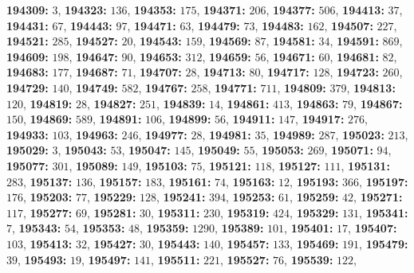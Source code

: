 \textsf{\bfseries 194309:} $3$, \textsf{\bfseries 194323:} $136$, \textsf{\bfseries 194353:} $175$, \textsf{\bfseries 194371:} $206$, \textsf{\bfseries 194377:} $506$, \textsf{\bfseries 194413:} $37$, \textsf{\bfseries 194431:} $67$, \textsf{\bfseries 194443:} $97$, \textsf{\bfseries 194471:} $63$, \textsf{\bfseries 194479:} $73$, \textsf{\bfseries 194483:} $162$, \textsf{\bfseries 194507:} $227$, \textsf{\bfseries 194521:} $285$, \textsf{\bfseries 194527:} $20$, \textsf{\bfseries 194543:} $159$, \textsf{\bfseries 194569:} $87$, \textsf{\bfseries 194581:} $34$, \textsf{\bfseries 194591:} $869$, \textsf{\bfseries 194609:} $198$, \textsf{\bfseries 194647:} $90$, \textsf{\bfseries 194653:} $312$, \textsf{\bfseries 194659:} $56$, \textsf{\bfseries 194671:} $60$, \textsf{\bfseries 194681:} $82$, \textsf{\bfseries 194683:} $177$, \textsf{\bfseries 194687:} $71$, \textsf{\bfseries 194707:} $28$, \textsf{\bfseries 194713:} $80$, \textsf{\bfseries 194717:} $128$, \textsf{\bfseries 194723:} $260$, \textsf{\bfseries 194729:} $140$, \textsf{\bfseries 194749:} $582$, \textsf{\bfseries 194767:} $258$, \textsf{\bfseries 194771:} $711$, \textsf{\bfseries 194809:} $379$, \textsf{\bfseries 194813:} $120$, \textsf{\bfseries 194819:} $28$, \textsf{\bfseries 194827:} $251$, \textsf{\bfseries 194839:} $14$, \textsf{\bfseries 194861:} $413$, \textsf{\bfseries 194863:} $79$, \textsf{\bfseries 194867:} $150$, \textsf{\bfseries 194869:} $589$, \textsf{\bfseries 194891:} $106$, \textsf{\bfseries 194899:} $56$, \textsf{\bfseries 194911:} $147$, \textsf{\bfseries 194917:} $276$, \textsf{\bfseries 194933:} $103$, \textsf{\bfseries 194963:} $246$, \textsf{\bfseries 194977:} $28$, \textsf{\bfseries 194981:} $35$, \textsf{\bfseries 194989:} $287$, \textsf{\bfseries 195023:} $213$, \textsf{\bfseries 195029:} $3$, \textsf{\bfseries 195043:} $53$, \textsf{\bfseries 195047:} $145$, \textsf{\bfseries 195049:} $55$, \textsf{\bfseries 195053:} $269$, \textsf{\bfseries 195071:} $94$, \textsf{\bfseries 195077:} $301$, \textsf{\bfseries 195089:} $149$, \textsf{\bfseries 195103:} $75$, \textsf{\bfseries 195121:} $118$, \textsf{\bfseries 195127:} $111$, \textsf{\bfseries 195131:} $283$, \textsf{\bfseries 195137:} $136$, \textsf{\bfseries 195157:} $183$, \textsf{\bfseries 195161:} $74$, \textsf{\bfseries 195163:} $12$, \textsf{\bfseries 195193:} $366$, \textsf{\bfseries 195197:} $176$, \textsf{\bfseries 195203:} $77$, \textsf{\bfseries 195229:} $128$, \textsf{\bfseries 195241:} $394$, \textsf{\bfseries 195253:} $61$, \textsf{\bfseries 195259:} $42$, \textsf{\bfseries 195271:} $117$, \textsf{\bfseries 195277:} $69$, \textsf{\bfseries 195281:} $30$, \textsf{\bfseries 195311:} $230$, \textsf{\bfseries 195319:} $424$, \textsf{\bfseries 195329:} $131$, \textsf{\bfseries 195341:} $7$, \textsf{\bfseries 195343:} $54$, \textsf{\bfseries 195353:} $48$, \textsf{\bfseries 195359:} $1290$, \textsf{\bfseries 195389:} $101$, \textsf{\bfseries 195401:} $17$, \textsf{\bfseries 195407:} $103$, \textsf{\bfseries 195413:} $32$, \textsf{\bfseries 195427:} $30$, \textsf{\bfseries 195443:} $140$, \textsf{\bfseries 195457:} $133$, \textsf{\bfseries 195469:} $191$, \textsf{\bfseries 195479:} $39$, \textsf{\bfseries 195493:} $19$, \textsf{\bfseries 195497:} $141$, \textsf{\bfseries 195511:} $221$, \textsf{\bfseries 195527:} $76$, \textsf{\bfseries 195539:} $122$, 
